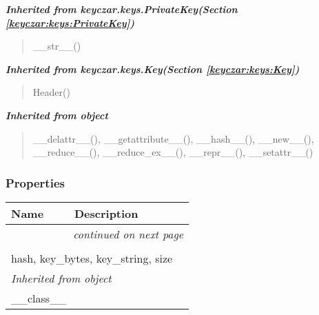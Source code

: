 \large{\textbf{\textit{Inherited from keyczar.keys.PrivateKey\textit{(Section \ref{keyczar:keys:PrivateKey})}}}}

\begin{quote}
\_\_str\_\_()
\end{quote}

\large{\textbf{\textit{Inherited from keyczar.keys.Key\textit{(Section \ref{keyczar:keys:Key})}}}}

\begin{quote}
Header()
\end{quote}

\large{\textbf{\textit{Inherited from object}}}

\begin{quote}
\_\_delattr\_\_(), \_\_getattribute\_\_(), \_\_hash\_\_(), \_\_new\_\_(), \_\_reduce\_\_(), \_\_reduce\_ex\_\_(), \_\_repr\_\_(), \_\_setattr\_\_()
\end{quote}


  \subsubsection{Properties}

    \vspace{-1cm}
\hspace{\varindent}\begin{longtable}{|p{\varnamewidth}|p{\vardescrwidth}|l}
\cline{1-2}
\cline{1-2} \centering \textbf{Name} & \centering \textbf{Description}& \\
\cline{1-2}
\endhead\cline{1-2}\multicolumn{3}{r}{\small\textit{continued on next page}}\\\endfoot\cline{1-2}
\endlastfoot\multicolumn{2}{|l|}{\textit{Inherited from keyczar.keys.Key \textit{(Section \ref{keyczar:keys:Key})}}}\\
\multicolumn{2}{|p{\varwidth}|}{\raggedright hash, key\_bytes, key\_string, size}\\
\cline{1-2}
\multicolumn{2}{|l|}{\textit{Inherited from object}}\\
\multicolumn{2}{|p{\varwidth}|}{\raggedright \_\_class\_\_}\\
\cline{1-2}
\end{longtable}


